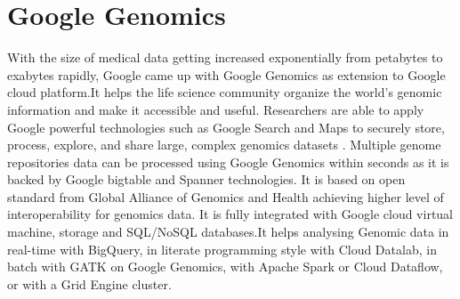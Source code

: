 \section{Google Genomics}

With the size of medical data getting increased exponentially from petabytes to exabytes rapidly, Google came up with Google Genomics as extension to Google cloud platform.It helps the life science community organize the world’s genomic information and make it accessible and useful\cite{www-genomics}. Researchers are able to apply Google powerful technologies such as Google Search and Maps to securely store, process, explore, and share large, complex genomics datasets \cite{www-genomics}.
Multiple genome repositories data can be processed using Google Genomics within seconds as it is backed by Google bigtable and Spanner technologies\cite{www-genomics}. It is based on open standard from Global Alliance of Genomics and Health achieving higher level of interoperability for genomics data\cite{www-genomics}. It is fully integrated with Google cloud virtual machine, storage and SQL/NoSQL databases\cite{www-genomics}.It helps analysing Genomic data in real-time with BigQuery, in literate programming style with Cloud Datalab, in batch with GATK on Google Genomics, with Apache Spark or Cloud Dataflow, or with a Grid Engine cluster\cite{www-genomics}.
